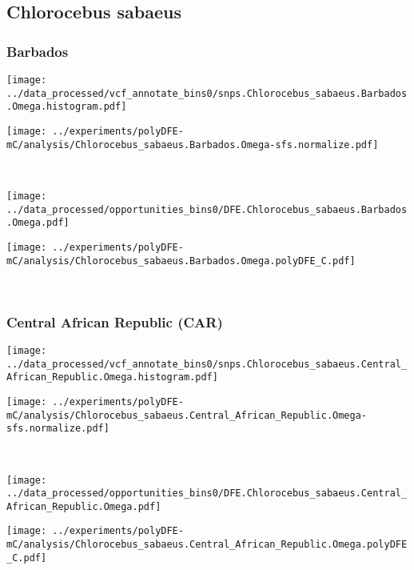 \subsection{Chlorocebus sabaeus}

\subsubsection{Barbados}

\begin{minipage}{0.49\linewidth}
    \texttt{[image: ../data\_processed/vcf\_annotate\_bins0/snps.Chlorocebus\_sabaeus.Barbados.Omega.histogram.pdf]}
\end{minipage}
\begin{minipage}{0.49\linewidth}
    \texttt{[image: ../experiments/polyDFE-mC/analysis/Chlorocebus\_sabaeus.Barbados.Omega-sfs.normalize.pdf]}
\end{minipage}
\\
\begin{minipage}{0.49\linewidth}
    \texttt{[image: ../data\_processed/opportunities\_bins0/DFE.Chlorocebus\_sabaeus.Barbados.Omega.pdf]}
\end{minipage}
\begin{minipage}{0.49\linewidth}
    \texttt{[image: ../experiments/polyDFE-mC/analysis/Chlorocebus\_sabaeus.Barbados.Omega.polyDFE\_C.pdf]}
\end{minipage}
\\

\subsubsection{Central African Republic (CAR)}

\begin{minipage}{0.49\linewidth}
    \texttt{[image: ../data\_processed/vcf\_annotate\_bins0/snps.Chlorocebus\_sabaeus.Central\_African\_Republic.Omega.histogram.pdf]}
\end{minipage}
\begin{minipage}{0.49\linewidth}
    \texttt{[image: ../experiments/polyDFE-mC/analysis/Chlorocebus\_sabaeus.Central\_African\_Republic.Omega-sfs.normalize.pdf]}
\end{minipage}
\\
\begin{minipage}{0.49\linewidth}
    \texttt{[image: ../data\_processed/opportunities\_bins0/DFE.Chlorocebus\_sabaeus.Central\_African\_Republic.Omega.pdf]}
\end{minipage}
\begin{minipage}{0.49\linewidth}
    \texttt{[image: ../experiments/polyDFE-mC/analysis/Chlorocebus\_sabaeus.Central\_African\_Republic.Omega.polyDFE\_C.pdf]}
\end{minipage}
\\

